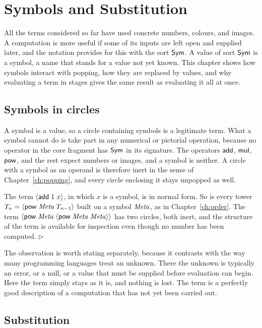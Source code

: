 \chapter{Symbols and Substitution}
\label{ch:symbols}

All the terms considered so far have used concrete numbers, colours, and images. A computation is more useful if some of its inputs are left open and supplied later, and the notation provides for this with the sort $\mathsf{Sym}$. A value of sort $\mathsf{Sym}$ is a symbol, a name that stands for a value not yet known. This chapter shows how symbols interact with popping, how they are replaced by values, and why evaluating a term in stages gives the same result as evaluating it all at once.

\section{Symbols in circles}

A symbol is a value, so a circle containing symbols is a legitimate term. What a symbol cannot do is take part in any numerical or pictorial operation, because no operator in the core fragment has $\mathsf{Sym}$ in its signature. The operators $\mathsf{add}$, $\mathsf{mul}$, $\mathsf{pow}$, and the rest expect numbers or images, and a symbol is neither. A circle with a symbol as an operand is therefore inert in the sense of Chapter~\ref{ch:popping}, and every circle enclosing it stays unpopped as well.

\begin{example}
The term $\langle \mathsf{add}\; 1\; x\rangle$, in which $x$ is a symbol, is in normal form. So is every tower $T_n=\langle \mathsf{pow}\; \mathit{Meta}\; T_{n-1}\rangle$ built on a symbol $\mathit{Meta}$, as in Chapter~\ref{ch:order}. The term $\langle \mathsf{pow}\; \mathit{Meta}\; \langle \mathsf{pow}\; \mathit{Meta}\; \mathit{Meta}\rangle\rangle$ has two circles, both inert, and the structure of the term is available for inspection even though no number has been computed. \hfill$\triangleright$
\end{example}

The observation is worth stating separately, because it contrasts with the way many programming languages treat an unknown. There the unknown is typically an error, or a null, or a value that must be supplied before evaluation can begin. Here the term simply stays as it is, and nothing is lost. The term is a perfectly good description of a computation that has not yet been carried out.

\section{Substitution}

